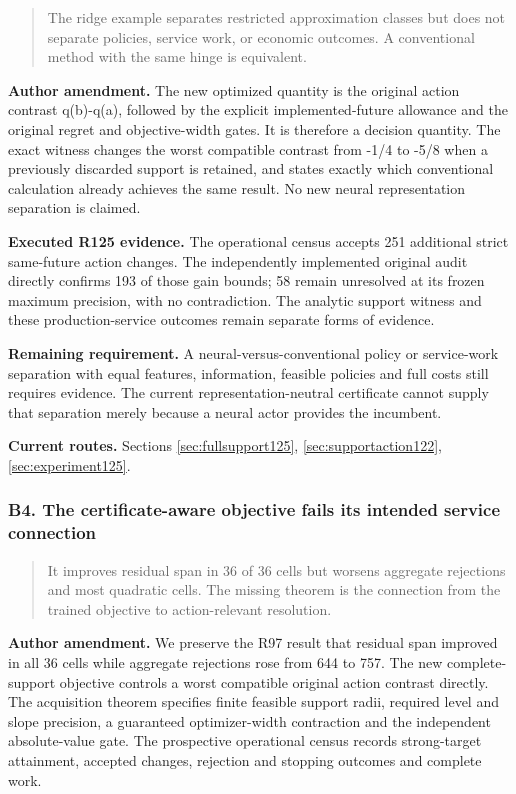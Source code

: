 \begin{quote}\small
The ridge example separates restricted approximation classes but does not separate policies, service work, or economic outcomes. A conventional method with the same hinge is equivalent.
\end{quote}

\noindent\textbf{Author amendment.} The new optimized quantity is the original action contrast q(b)-q(a), followed by the explicit implemented-future allowance and the original regret and objective-width gates. It is therefore a decision quantity. The exact witness changes the worst compatible contrast from -1/4 to -5/8 when a previously discarded support is retained, and states exactly which conventional calculation already achieves the same result. No new neural representation separation is claimed.

\noindent\textbf{Executed R125 evidence.} The operational census accepts 251 additional strict same-future action changes. The independently implemented original audit directly confirms 193 of those gain bounds; 58 remain unresolved at its frozen maximum precision, with no contradiction. The analytic support witness and these production-service outcomes remain separate forms of evidence.

\noindent\textbf{Remaining requirement.} A neural-versus-conventional policy or service-work separation with equal features, information, feasible policies and full costs still requires evidence. The current representation-neutral certificate cannot supply that separation merely because a neural actor provides the incumbent.

\noindent\textbf{Current routes.} Sections \ref{sec:fullsupport125}, \ref{sec:supportaction122}, \ref{sec:experiment125}.

\subsubsection{B4. The certificate-aware objective fails its intended service connection}

\begin{quote}\small
It improves residual span in 36 of 36 cells but worsens aggregate rejections and most quadratic cells. The missing theorem is the connection from the trained objective to action-relevant resolution.
\end{quote}

\noindent\textbf{Author amendment.} We preserve the R97 result that residual span improved in all 36 cells while aggregate rejections rose from 644 to 757. The new complete-support objective controls a worst compatible original action contrast directly. The acquisition theorem specifies finite feasible support radii, required level and slope precision, a guaranteed optimizer-width contraction and the independent absolute-value gate. The prospective operational census records strong-target attainment, accepted changes, rejection and stopping outcomes and complete work.

